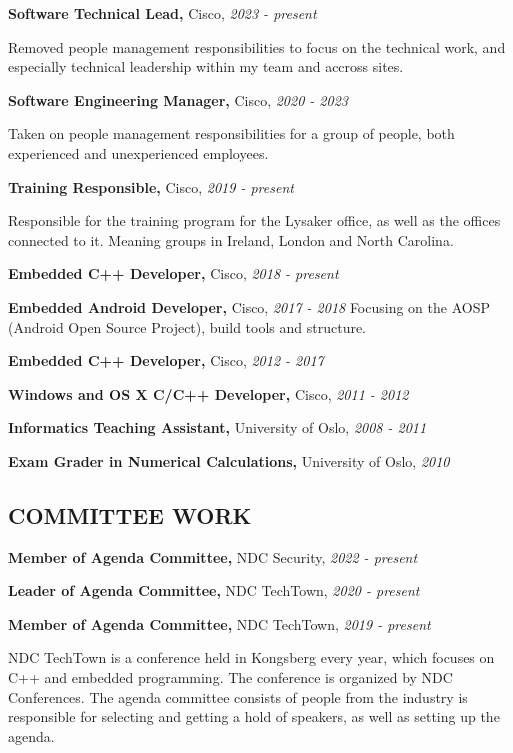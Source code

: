 \documentclass{article}
\newcommand\CVEntry[3]{
  {\bf #1,} #2, {\it #3}
}
\newcommand\CVComment[4]{
  \CVEntry{#1}{#2}{#3}

  #4
}
\begin{document}
\begin{addmargin}[2em]{0em}
  \CVComment{Software Technical Lead}{Cisco}{2023 - present}{
    Removed people management responsibilities to focus on the technical work, and especially
    technical leadership within my team and accross sites.}

  \CVComment{Software Engineering Manager}{Cisco}{2020 - 2023}{
    Taken on people management responsibilities for a group of people, both experienced and 
    unexperienced employees.}

  \CVComment{Training Responsible}{Cisco}{2019 - present}{
    Responsible for the training program for the Lysaker office, as well as the offices connected to
    it. Meaning groups in Ireland, London and North Carolina.}

  \CVEntry{Embedded C++ Developer}{Cisco}{2018 - present}

  \CVEntry{Embedded Android Developer}{Cisco}{2017 - 2018}{
    Focusing on the AOSP (Android Open Source Project), build tools and structure.
  }

  \CVEntry{Embedded C++ Developer}{Cisco}{2012 - 2017}

  \CVEntry{Windows and OS X C/C++ Developer}{Cisco}{2011 - 2012}

  \CVEntry{Informatics Teaching Assistant}{University of Oslo}{2008 - 2011}

  \CVEntry{Exam Grader in Numerical Calculations}{University of Oslo}{2010}

\end{addmargin}

\subsection*{COMMITTEE WORK}

\begin{addmargin}[2em]{0em}
  \CVEntry{Member of Agenda Committee}{NDC Security}{2022 - present}

  \CVEntry{Leader of Agenda Committee}{NDC TechTown}{2020 - present}

  \CVComment{Member of Agenda Committee}{NDC TechTown}{2019 - present}{
    NDC TechTown is a conference held in Kongsberg every year, which focuses on C++
    and embedded programming. The conference is organized by NDC Conferences. The
    agenda committee consists of people from the industry is responsible for
    selecting and getting a hold of speakers, as well as setting up the agenda.}

\end{addmargin}
\end{document}
